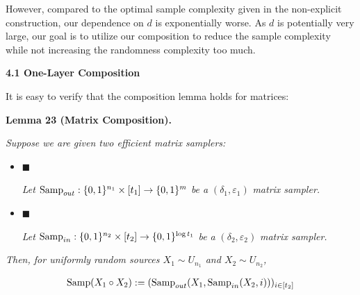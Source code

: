 \documentclass[10pt,a4paper]{article}
\begin{document}
However, compared to the optimal sample complexity given in the non-explicit construction, our dependence on $d$ is exponentially worse.
As $d$ is potentially very large, our goal is to utilize our composition to reduce the sample complexity while not increasing the randomness complexity too much.\par




\par\medskip\noindent\textbf{
4.1 One-Layer Composition}\par




It is easy to verify that the composition lemma holds for matrices:\par





\par\medskip\noindent\textbf{
\textbf{Lemma 23}\textbf{ }(Matrix Composition)\textbf{.}
}\par



\emph{Suppose we are given two efficient matrix samplers:}\par


\begin{itemize}


\item[] 
$\blacksquare$ 


\emph{Let }$\textup{{Samp}}_{out}:\{0,1\}^{n_{1}}\times[t_{1}]\to\{0,1\}^{m}$\emph{ be a }$(\delta_{1},\varepsilon_{1})$\emph{ matrix sampler.}\par





\item[] 
$\blacksquare$ 


\emph{Let }$\textup{{Samp}}_{in}:\{0,1\}^{n_{2}}\times[t_{2}]\to\{0,1\}^{\log t_{1}}$\emph{ be a }$(\delta_{2},\varepsilon_{2})$\emph{ matrix sampler.}\par





\end{itemize}


\emph{Then, for uniformly random sources $X_{1}\sim U_{n_{1}}$ and $X_{2}\sim U_{n_{2}}$,}\par


\[\begin{gathered}
\textup{{Samp}}(X_{1}\circ X_{2}):=(\textup{{Samp}}_{out}(X_{1},\textup{{Samp}}_{in}(X_{2},i)))_{i\in[t_{2}]}
\end{gathered}\]
\end{document}
